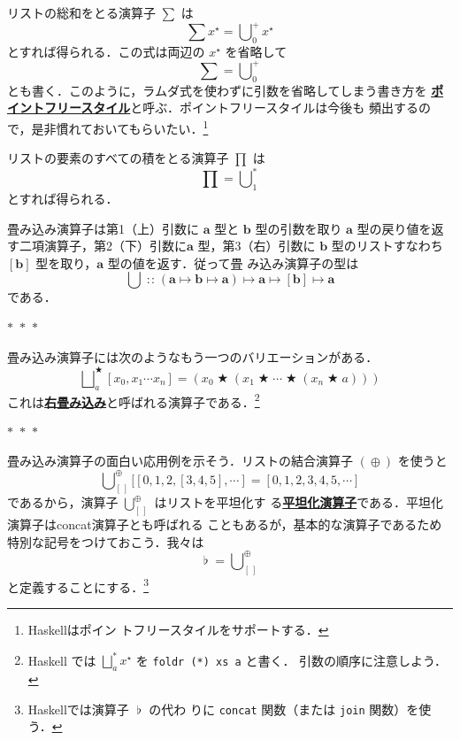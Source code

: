 \documentclass[a5paper,twoside,fleqn,draft]{jsbook}
\newcommand{\separator}{\begin{center}$*$~$*$~$*$\end{center}}
\newcommand{\programminglanguage}[1]{\textsf{#1}}
\newcommand{\haskell}{\programminglanguage{Haskell}}
\newcommand{\keyword}[1]{{\underline{\textbf{#1}}}}
\newcommand{\code}[1]{\texttt{#1}}
\newcommand{\mEmptyList}{{[\,]}}
\DeclareMathOperator{\mAppend}{\oplus}
\DeclareMathOperator{\mBinOp}{\bigstar}
\DeclareMathOperator*{\mFold}{\bigcup}
\DeclareMathOperator*{\mFoldRight}{\bigsqcup}
\DeclareMathOperator{\mFuncArrow}{\mapsto}
\DeclareMathOperator{\mIn}{{:\!:}}
\DeclareMathOperator{\mJoinList}{\flat} %
\newcommand{\mType}[1]{\mathbf{#1}} %
\newcommand{\mA}{\mType{a}}
\newcommand{\mB}{\mType{b}}
\newcommand{\mList}[1]{{#1}^\mathrm{\star}}
\begin{document}
リストの総和をとる演算子 $\sum$ は
\begin{equation}
  \sum\mList{x}
  =\mFold^+_0\mList{x}
\end{equation}
とすれば得られる．この式は両辺の $\mList{x}$ を省略して
\begin{equation}
  \sum
  =\mFold^+_0
\end{equation}
とも書く．このように，ラムダ式を使わずに引数を省略してしまう書き方を
\keyword{ポイントフリースタイル}と呼ぶ．ポイントフリースタイルは今後も
頻出するので，是非慣れておいてもらいたい．\footnote{\haskell はポイン
  トフリースタイルをサポートする．}

リストの要素のすべての積をとる演算子 $\prod$ は
\begin{equation}
  \prod
  =\mFold^*_1
\end{equation}
とすれば得られる．

畳み込み演算子は第1（上）引数に $\mA$ 型と $\mB$ 型の引数を取り $\mA$
型の戻り値を返す二項演算子，第2（下）引数に$\mA$ 型，第3（右）引数に
$\mB$ 型のリストすなわち$[\mB]$ 型を取り，$\mA$ 型の値を返す．従って畳
み込み演算子の型は
\begin{equation}
  \mFold
  \mIn(\mA\mFuncArrow\mB\mFuncArrow\mA)
  \mFuncArrow\mA
  \mFuncArrow[\mB]
  \mFuncArrow\mA
\end{equation}
である．

\separator

畳み込み演算子には次のようなもう一つのバリエーションがある．
\begin{equation}
  \mFoldRight^{\mBinOp}_a[x_0,x_1\dotsb x_n]
  =(x_0\mBinOp(x_1\mBinOp\dotsb\mBinOp(x_n\mBinOp a)))
\end{equation}
これは\keyword{右畳み込み}と呼ばれる演算子である．\footnote{\haskell
  では $\mFoldRight^{*}_a\mList{x}$ を \code{foldr (*) xs a} と書く．
  引数の順序に注意しよう．}

\separator

畳み込み演算子の面白い応用例を示そう．リストの結合演算子 $(\mAppend)$
を使うと
\begin{equation}
  \mFold_\mEmptyList^{\mAppend}[[0,1,2,[3,4,5],\dotsb]
  =[0,1,2,3,4,5,\dotsb]
\end{equation}
であるから，演算子 $\mFold_\mEmptyList^{\mAppend}$ はリストを平坦化す
る\keyword{平坦化演算子}である．平坦化演算子はconcat演算子とも呼ばれる
こともあるが，基本的な演算子であるため特別な記号をつけておこう．我々は
\begin{equation}
  \mJoinList
  =\mFold_\mEmptyList^{\mAppend}
\end{equation}
と定義することにする．\footnote{\haskell では演算子 $\mJoinList$ の代わ
  りに \code{concat} 関数（または \code{join} 関数）を使う．}
\end{document}
